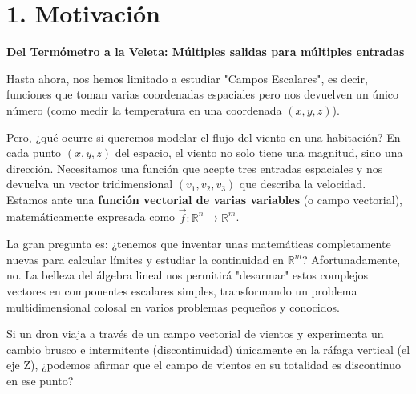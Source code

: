 \documentclass[11pt]{article}
\newenvironment{motivacion}{%
  \section*{1. Motivación}%
}{}
\newenvironment{preguntaguia}{%
  \begin{tcolorbox}[colback=cyan!5,colframe=cyan!75!black,title=Pregunta Guía]%
}{%
  \end{tcolorbox}%
}
\begin{document}
\begin{motivacion}
  \textbf{Del Termómetro a la Veleta: Múltiples salidas para múltiples entradas}

  Hasta ahora, nos hemos limitado a estudiar "Campos Escalares", es decir, funciones que toman varias coordenadas espaciales pero nos devuelven un único número (como medir la temperatura en una coordenada $(x,y,z)$). 

  Pero, ¿qué ocurre si queremos modelar el flujo del viento en una habitación? En cada punto $(x,y,z)$ del espacio, el viento no solo tiene una magnitud, sino una dirección. Necesitamos una función que acepte tres entradas espaciales y nos devuelva un vector tridimensional $(v_1, v_2, v_3)$ que describa la velocidad. Estamos ante una \textbf{función vectorial de varias variables} (o campo vectorial), matemáticamente expresada como $\vec{f} \colon \mathbb{R}^n \to \mathbb{R}^m$.
  
  La gran pregunta es: ¿tenemos que inventar unas matemáticas completamente nuevas para calcular límites y estudiar la continuidad en $\mathbb{R}^m$? Afortunadamente, no. La belleza del álgebra lineal nos permitirá "desarmar" estos complejos vectores en componentes escalares simples, transformando un problema multidimensional colosal en varios problemas pequeños y conocidos.

  \begin{preguntaguia}
    Si un dron viaja a través de un campo vectorial de vientos y experimenta un cambio brusco e intermitente (discontinuidad) únicamente en la ráfaga vertical (el eje Z), ¿podemos afirmar que el campo de vientos en su totalidad es discontinuo en ese punto?
  \end{preguntaguia}
\end{motivacion}
\end{document}
